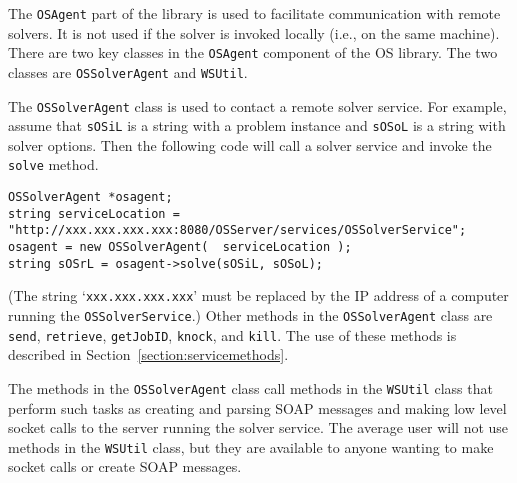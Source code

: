 \label{section:oslibrary} 

\label{section:osagent}

The {\tt OSAgent}  part of the library is used to facilitate communication
with remote solvers. It is not used if the solver is invoked locally (i.e., on the same machine).
There are two key classes in the {\tt OSAgent} component of the OS library. The two classes are
{\tt OSSolverAgent} and {\tt WSUtil}.

The {\tt OSSolverAgent} class is used to contact a remote solver service.  For example, assume that {\tt sOSiL}
is a string with a problem instance and {\tt sOSoL} is a string with solver options. Then the following code
will call a solver service and invoke the {\tt solve} method.
\begin{verbatim}
OSSolverAgent *osagent;
string serviceLocation = "http://xxx.xxx.xxx.xxx:8080/OSServer/services/OSSolverService";
osagent = new OSSolverAgent(  serviceLocation );
string sOSrL = osagent->solve(sOSiL, sOSoL);
\end{verbatim}
(The string `{\tt xxx.xxx.xxx.xxx}' must be replaced by the IP address of a computer running the {\tt OSSolverService}.)
Other methods in the {\tt OSSolverAgent} class are {\tt send}, {\tt retrieve}, {\tt getJobID}, {\tt knock}, and {\tt kill}.  
The use of these methods is described in Section~\ref{section:servicemethods}.



The methods in the {\tt OSSolverAgent} class call methods in the {\tt WSUtil} class that perform such tasks as 
creating and parsing SOAP messages and making low level socket calls to the server running the solver service. 
The average user will not use methods in the {\tt WSUtil} class, but they are available to anyone wanting to make socket calls or create SOAP messages.

\iffalse
There is also a method, {\tt OSFileUpload}, in the OSAgentClass that is used to upload files from the hard drive of a client to the server. 
It is very fast and does not involve SOAP or Web Services. The {\tt OSFileUpload}  method is illustrated and described in the example code 
{\tt OSFileUpload.cpp} described in Section~\ref{section:fileupload}.
\index{OSAgent@{\tt OSAgent}|)}
\fi


